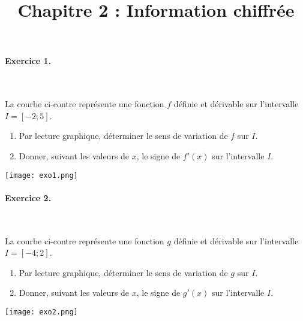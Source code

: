 \documentclass[11pt]{article}
\title{Chapitre 2 : Information chiffrée}
\date{}
\author{}
\begin{document}

\paragraph{Exercice 1.}~\\%
\begin{minipage}{.6\textwidth}
  La courbe ci-contre représente une fonction $f$ définie et dérivable sur
  l'intervalle $I=[-2;5]$.
  \begin{enumerate}
    \item Par lecture graphique, déterminer le sens de variation de $f$ sur $I$.
    \item Donner, suivant les valeurs de $x$, le signe de $f'(x)$ sur
      l'intervalle $I$.
  \end{enumerate}
\end{minipage}
\begin{minipage}{.4\textwidth}
  \begin{center}
    \texttt{[image: exo1.png]}
  \end{center}
\end{minipage}

\paragraph{Exercice 2.}~\\[-2mm]
\begin{minipage}{.6\textwidth}
  La courbe ci-contre représente une fonction $g$ définie et dérivable sur
  l'intervalle $I=[-4;2]$.
  \begin{enumerate}
    \item Par lecture graphique, déterminer le sens de variation de $g$ sur $I$.
    \item Donner, suivant les valeurs de $x$, le signe de $g'(x)$ sur
      l'intervalle $I$.
  \end{enumerate}
\end{minipage}
\begin{minipage}{.4\textwidth}
  \begin{center}
    \texttt{[image: exo2.png]}
  \end{center}
\end{minipage}
\end{document}
